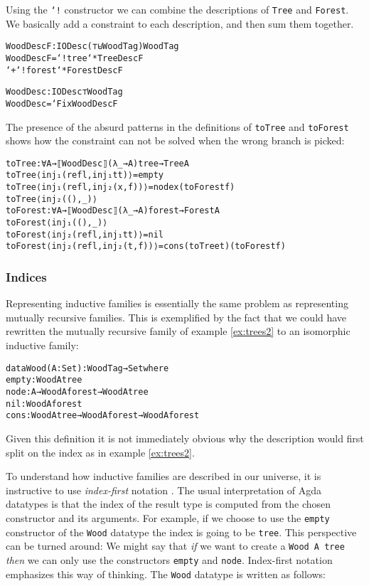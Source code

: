 \begin{example}\label{ex:trees2}
Using the \texttt{`!} constructor we can combine the descriptions of
\texttt{Tree} and \texttt{Forest}.
We basically add a constraint to each description, and then sum them
together.

\begin{alltt}
WoodDescF : IODesc (⊤ ⊎ WoodTag) WoodTag
WoodDescF = `! tree `* TreeDescF
         `+ `! forest `* ForestDescF

WoodDesc : IODesc ⊤ WoodTag
WoodDesc = `Fix WoodDescF
\end{alltt}

The presence of the absurd patterns in the definitions of
\texttt{toTree} and \texttt{toForest} shows how the constraint can not
be solved when the wrong branch is picked:

\begin{alltt}
toTree : ∀{A} → ⟦ WoodDesc ⟧ (λ _ → A) tree → Tree A
toTree ⟨ inj₁ (refl , inj₁ tt) ⟩ = empty
toTree ⟨ inj₁ (refl , inj₂ (x , f)) ⟩ = node x (toForest f)
toTree ⟨ inj₂ (() , _) ⟩
toForest : ∀{A} → ⟦ WoodDesc ⟧ (λ _ → A) forest → Forest A
toForest ⟨ inj₁ (() , _) ⟩
toForest ⟨ inj₂ (refl , inj₁ tt) ⟩ = nil
toForest ⟨ inj₂ (refl , inj₂ (t , f)) ⟩ = cons (toTree t) (toForest f)
\end{alltt}
\end{example}

\subsubsection{Indices}

Representing inductive families is essentially the same problem as
representing mutually recursive families.
This is exemplified by the fact that we could have rewritten the mutually
recursive family of example \ref{ex:trees2} to an isomorphic inductive family:

\begin{alltt}
data Wood (A : Set) : WoodTag → Set where
  empty : Wood A tree
  node  : A → Wood A forest → Wood A tree
  nil   : Wood A forest
  cons  : Wood A tree → Wood A forest → Wood A forest
\end{alltt}

Given this definition it is not immediately obvious why the description 
would first split on the index as in example \ref{ex:trees2}.

To understand how inductive families are described in our
universe, it is instructive to use \emph{index-first} notation
\cite{ko11}.
The usual interpretation of Agda datatypes is that the index of the
result type is computed from the chosen constructor and its
arguments.
For example, if we choose to use the \texttt{empty} constructor of the
\texttt{Wood} datatype the index is going to be \texttt{tree}.
This perspective can be turned around:
We might say that \emph{if} we want to create a \texttt{Wood A tree}
\emph{then} we can only use the constructors \texttt{empty} and
\texttt{node}.
Index-first notation emphasizes this way of thinking.
The \texttt{Wood} datatype is written as follows:

